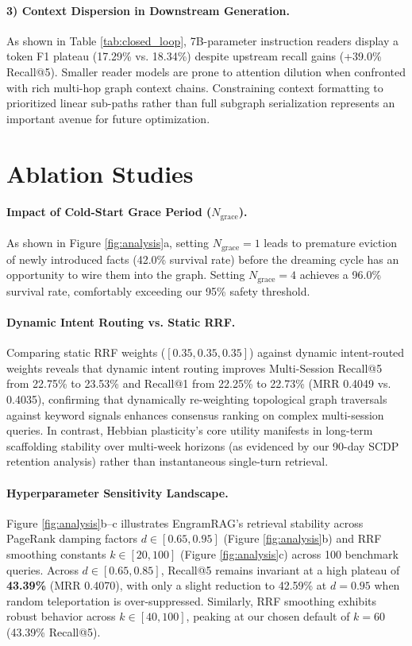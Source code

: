 \documentclass[conference]{IEEEtran}
\begin{document}
\paragraph{3) Context Dispersion in Downstream Generation.} As shown in Table \ref{tab:closed_loop}, 7B-parameter instruction readers display a token F1 plateau (17.29\% vs. 18.34\%) despite upstream recall gains (+39.0\% Recall@5). Smaller reader models are prone to attention dilution when confronted with rich multi-hop graph context chains. Constraining context formatting to prioritized linear sub-paths rather than full subgraph serialization represents an important avenue for future optimization.


\section{Ablation Studies}

\paragraph{Impact of Cold-Start Grace Period ($N_{\text{grace}}$).}
As shown in Figure \ref{fig:analysis}a, setting $N_{\text{grace}} = 1$ leads to premature eviction of newly introduced facts (42.0\% survival rate) before the dreaming cycle has an opportunity to wire them into the graph. Setting $N_{\text{grace}} = 4$ achieves a 96.0\% survival rate, comfortably exceeding our 95\% safety threshold.

\paragraph{Dynamic Intent Routing vs. Static RRF.}
Comparing static RRF weights ($[0.35, 0.35, 0.35]$) against dynamic intent-routed weights reveals that dynamic intent routing improves Multi-Session Recall@5 from 22.75\% to 23.53\% and Recall@1 from 22.25\% to 22.73\% (MRR 0.4049 vs. 0.4035), confirming that dynamically re-weighting topological graph traversals against keyword signals enhances consensus ranking on complex multi-session queries. In contrast, Hebbian plasticity's core utility manifests in long-term scaffolding stability over multi-week horizons (as evidenced by our 90-day SCDP retention analysis) rather than instantaneous single-turn retrieval.

\paragraph{Hyperparameter Sensitivity Landscape.}
Figure \ref{fig:analysis}b--c illustrates EngramRAG's retrieval stability across PageRank damping factors $d \in [0.65, 0.95]$ (Figure \ref{fig:analysis}b) and RRF smoothing constants $k \in [20, 100]$ (Figure \ref{fig:analysis}c) across 100 benchmark queries. Across $d \in [0.65, 0.85]$, Recall@5 remains invariant at a high plateau of \textbf{43.39\%} (MRR 0.4070), with only a slight reduction to 42.59\% at $d=0.95$ when random teleportation is over-suppressed. Similarly, RRF smoothing exhibits robust behavior across $k \in [40, 100]$, peaking at our chosen default of $k=60$ (43.39\% Recall@5).
\end{document}
